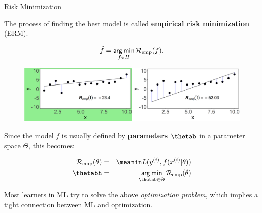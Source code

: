 \documentclass[11pt,compress,t,notes=noshow, xcolor=table]{beamer}
\begin{document}
\begin{vbframe}{Risk Minimization}


The process of finding the best model is called \textbf{empirical risk minimization} (ERM).

$$
\hat{f} = \mathop{\sf arg\,min}_{f \in H} \mathcal{R}_{\text{emp}}(f).
$$

\lz

\begin{center}
\begin{figure}[b]
\includegraphics[width=1\textwidth]{figure/ml-basic_riskmin-3-risk-min.png}
\end{figure}
\end{center}


\framebreak

Since the model $f$ is usually defined by \textbf{parameters} $\thetab$ in a parameter space $\Theta$, this becomes:

\begin{eqnarray*}
\risket & = & \meanin \Lxyit \cr
\thetabh & = & \argmin_{\thetab \in \Theta} \risket
\end{eqnarray*}

Most learners in ML try to solve the above \emph{optimization problem}, which implies a tight connection between ML and optimization.

\end{vbframe}
\end{document}
